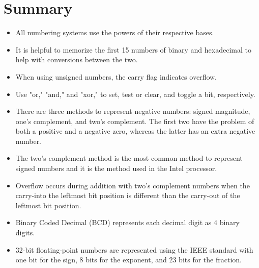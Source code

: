 \documentclass[10pt]{book}
\begin{document}
\section{Summary}
\begin{itemize}
  \item All numbering systems use the powers of their respective bases.
  \item It is helpful to memorize the first 15 numbers of binary and hexadecimal to help with conversions between the two.
  \item When using unsigned numbers, the carry flag indicates overflow.
  \item Use "or," "and," and "xor," to set, test or clear, and toggle a bit, respectively.
  \item There are three methods to represent negative numbers: signed magnitude, one's complement, and two's complement. The first two have the problem of both a positive and a negative zero, whereas the latter has an extra negative number.
  \item The two's complement method is the most common method to represent signed numbers and it is the method used in the Intel processor.
  \item Overflow occurs during addition with two's complement numbers when the carry-into the leftmost bit position is different than the carry-out of the leftmost bit position.
  \item Binary Coded Decimal (BCD) represents each decimal digit as 4 binary digits.
  \item 32-bit floating-point numbers are represented using the IEEE standard with one bit for the sign, 8 bits for the exponent, and 23 bits for the fraction.
\end{itemize}
\end{document}
